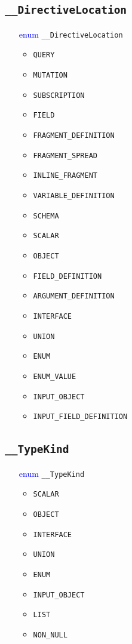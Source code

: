 \documentclass[10pt, a4paper]{memoir}
\numberwithin{equation}{section}
\theoremstyle{plain}
\theoremstyle{defp}
\theoremstyle{dotless}
\theoremstyle{definition}
\theoremstyle{dotless}
\theoremstyle{dotless}
\theoremstyle{defp}
\theoremstyle{defp}
\theoremstyle{be}          %
\theoremstyle{defp}
\newcommand\ttt[1]{\texttt{#1}}
\begin{document}
\subsection{\ttt{\_\_DirectiveLocation}}\label{sec:DirectiveLocation}
\begin{itemize}[noitemsep,topsep=1pt]
\item[\textcolor{blue}{enum}] \ttt{\_\_DirectiveLocation}
\begin{itemize}[itemsep=1pt,topsep=1pt]
\item \ttt{QUERY}
\item \ttt{MUTATION}
\item \ttt{SUBSCRIPTION}
\item \ttt{FIELD}
\item \ttt{FRAGMENT\_DEFINITION}
\item \ttt{FRAGMENT\_SPREAD}
\item \ttt{INLINE\_FRAGMENT}
\item \ttt{VARIABLE\_DEFINITION}
\item \ttt{SCHEMA}
\item \ttt{SCALAR}
\item \ttt{OBJECT}
\item \ttt{FIELD\_DEFINITION}
\item \ttt{ARGUMENT\_DEFINITION}
\item \ttt{INTERFACE}
\item \ttt{UNION}
\item \ttt{ENUM}
\item \ttt{ENUM\_VALUE}
\item \ttt{INPUT\_OBJECT}
\item \ttt{INPUT\_FIELD\_DEFINITION}
\end{itemize}
\end{itemize}


\subsection{\ttt{\_\_TypeKind}}\label{sec:TypeKind}
\begin{itemize}[noitemsep,topsep=1pt]
\item[\textcolor{blue}{enum}] \ttt{\_\_TypeKind}
\begin{itemize}[itemsep=1pt,topsep=1pt]
\item \ttt{SCALAR}
\item \ttt{OBJECT}
\item \ttt{INTERFACE}
\item \ttt{UNION}
\item \ttt{ENUM}
\item \ttt{INPUT\_OBJECT}
\item \ttt{LIST}
\item \ttt{NON\_NULL}
\end{itemize}
\end{itemize}


\newpage


\printbibliography
\end{document}
